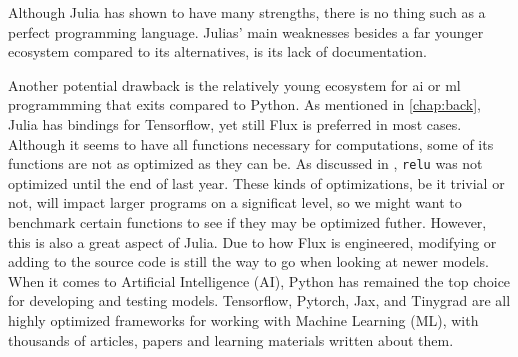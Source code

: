  
Although Julia has shown to have many strengths, there is no thing such as a perfect programming language. Julias' main weaknesses besides a far younger ecosystem compared to its alternatives, is its lack of documentation. 

Another potential drawback is the relatively young ecosystem for \acrshort{ai} or \acrshort{ml} programmming that exits compared to Python. As mentioned in \ref{chap:back}, Julia has bindings for Tensorflow, yet still Flux is preferred in most cases. Although it seems to have all functions necessary for computations, some of its functions are not as optimized as they can be. As discussed in \cite{projthesis}, \lstinline|relu| was not optimized until the end of last year. These kinds of optimizations, be it trivial or not, will impact larger programs on a significat level, so we might want to benchmark certain functions to see if they may be optimized futher. However, this is also a great aspect of Julia. Due to how Flux is engineered, modifying or adding to the source code is still the way to go when looking at newer models. \\

When it comes to Artificial Intelligence (AI), Python has remained the top choice for developing and testing models. Tensorflow, Pytorch, Jax, and Tinygrad are all highly optimized frameworks for working with Machine Learning (ML), with thousands of articles, papers and learning materials written about them.
